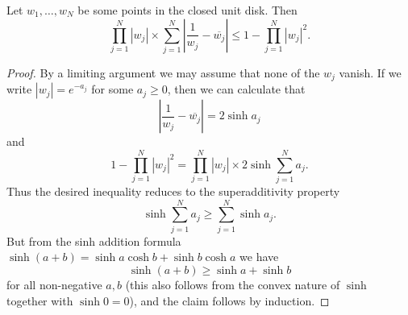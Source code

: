 \documentclass[12pt]{article}
\begin{document}
\begin{lemma}  Let $w_1,\dots,w_N$ be some points in the closed unit disk.  Then
$$ \prod_{j=1}^N |w_j| \times \sum_{j=1}^N |\frac{1}{w_j} - \overline{w_j}| \leq 1 - \prod_{j=1}^N |w_j|^2.$$
\end{lemma}

\begin{proof} By a limiting argument we may assume that none of the $w_j$ vanish.  If we write $|w_j| = e^{-a_j}$ for some $a_j \geq 0$, then we can calculate that
    $$ |\frac{1}{w_j} - \overline{w_j}| = 2 \sinh a_j$$
    and
$$ 1 - \prod_{j=1}^N |w_j|^2 = \prod_{j=1}^N |w_j| \times 2 \sinh \sum_{j=1}^N a_j.$$
Thus the desired inequality reduces to the superadditivity property
$$ \sinh \sum_{j=1}^N a_j \geq \sum_{j=1}^N \sinh a_j.$$
But from the sinh addition formula $\sinh(a+b) = \sinh a \cosh b + \sinh b \cosh a$ we have
$$ \sinh(a+b) \geq \sinh a + \sinh b$$
for all non-negative $a,b$ (this also follows from the convex nature of $\sinh$ together with $\sinh 0 = 0$), and the claim follows by induction.
\end{proof}
\end{document}
